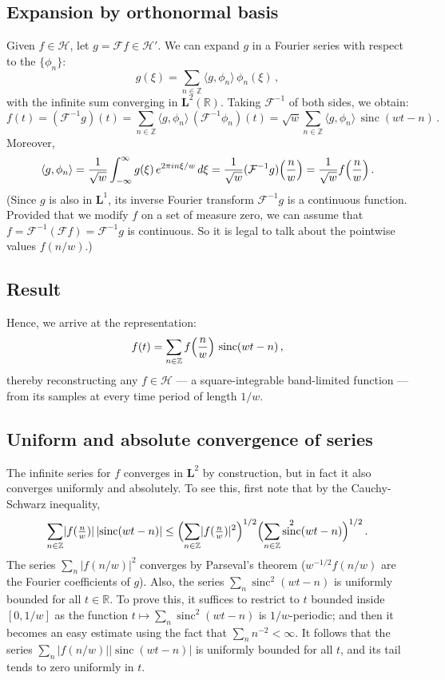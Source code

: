 \documentclass[12pt]{article}
\newcommand{\real}{\mathbb{R}}
\newcommand{\intset}{\mathbb{Z}}
\newcommand{\Hilb}{\mathcal{H}}
\newcommand{\FT}{\mathcal{F}}
\newcommand{\Le}{\mathbf{L}}
\providecommand{\abs}[1]{\lvert#1\rvert}
\DeclareMathOperator{\sinc}{sinc}
\begin{document}
\subsection{Expansion by orthonormal basis}

Given $f \in \Hilb$, let $g = \FT f \in \Hilb'$.
We can expand $g$ in a Fourier series with respect
to the  $\{ \phi_n \}$:
\[
g(\xi) = \sum_{n \in \intset} \langle g, \phi_n \rangle \, \phi_n(\xi)\,,
\]
with the infinite sum converging in $\Le^2(\real)$.
Taking $\FT^{-1}$ of both sides,
we obtain:
\[
f(t) = (\FT^{-1} g)(t) = \sum_{n \in \intset}
\langle g, \phi_n \rangle \, (\FT^{-1} \phi_n)(t) 
=
\sqrt{w} \sum_{n \in \intset}
\langle g, \phi_n \rangle \, \sinc(wt-n)\,.
\]
Moreover,
\[
\langle g, \phi_n \rangle =
\frac{1}{\sqrt{w}} \int_{-\infty}^\infty g(\xi) \, e^{2\pi i n \xi/w} \, d\xi
= \frac{1}{\sqrt{w}} (\FT^{-1} g)\Bigl( \frac{n}{w} \Bigr) = \frac{1}{\sqrt{w}} f\Bigl( \frac{n}{w} \Bigr)\,.
\]
(Since $g$ is also in $\Le^1$, its inverse Fourier transform
$\FT^{-1}g$ is a continuous function.  
Provided that we modify
$f$ on a set of measure zero, we can assume that $f = \FT^{-1} (\FT f) = \FT^{-1} g$ is continuous.  So it is legal to talk about the pointwise
values $f(n/w)$.)

\subsection{Result}

Hence, we arrive at the representation:
\[
f(t) = \sum_{n \in \intset} f\Bigl( \frac{n}{w} \Bigr) \, \sinc(wt - n)\,,
\]
thereby reconstructing any $f \in \Hilb$ --- a square-integrable band-limited 
function ---
from its samples at every time period of length $1/w$.

\subsection{Uniform and absolute convergence of series}

The infinite series for $f$ converges in $\Le^2$
by construction, but in fact it also converges uniformly and absolutely.
To see this, first note that by the Cauchy-Schwarz inequality,
\[
\sum_{n \in \intset} \abs{ f(\tfrac{n}{w}) }
\, \abs{\sinc (wt-n)}
\leq \Bigl( \sum_{n \in \intset} \abs{f(\tfrac{n}{w})}^2 \Bigr)^{1/2}
\Bigl( \sum_{n \in \intset} \sinc^2(wt -n) \Bigr)^{1/2}\,.
\]
The series $\sum_n \abs{f(n/w)}^2$ converges by Parseval's theorem
($w^{-1/2} f(n/w)$ are the Fourier coefficients of $g$).
Also, the series $\sum_n \sinc^2(wt-n)$ is uniformly bounded for all $t \in \real$.  To prove this, it suffices to 
restrict to $t$ bounded inside $[0, 1/w]$
as the function $t \mapsto \sum_n \sinc^2(wt-n)$ is $1/w$-periodic; and then 
it becomes an easy estimate using the fact that $\sum_n n^{-2} < \infty$.
It follows that the series $\sum_n \abs{f(n/w)} \abs{\sinc(wt-n)}$
is uniformly bounded for all $t$,
and its tail tends to zero uniformly in $t$.
\end{document}
